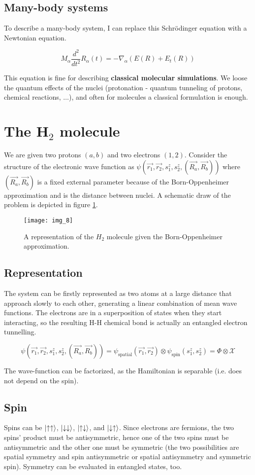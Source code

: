 	\subsection{Many-body systems}
	To describe a many-body system, I can replace this Schr\"odinger equation with a Newtonian equation.

	$$M_\alpha\frac{d^2}{dt^2}R_\alpha(t)=-\nabla_\alpha(E(R)+E_t(R))$$

	This equation is fine for describing \textbf{classical molecular simulations}.
	We loose the quantum effects of the nuclei (protonation - quantum tunneling of protons, chemical reactions, $\dots$), and often for molecules a classical formulation is enough.

\section{The H$_2$ molecule}
We are given two protons $(a,b)$ and two electrons $(1,2)$.
Consider the structure of the electronic wave function as $\psi(\vec{r_1},\vec{r_2},s_1^z,s_2^z,(\vec{R_a},\vec{R_b}))$ where $(\vec{R_a},\vec{R_b})$ is a fixed external parameter because of the Born-Oppenheimer approximation and is the distance between nuclei.
A schematic draw of the problem is depicted in figure \ref{fig:h2}.

\begin{figure}[htbp!]
	\centering
	\texttt{[image: img\_8]}
	\caption{A representation of the $H_2$ molecule given the Born-Oppenheimer approximation.}
	\label{fig:h2}
\end{figure}

	\subsection{Representation}
	The system can be firstly represented as two atoms at a large distance that approach slowly to each other, generating a linear combination of mean wave functions.
	The electrons are in a superposition of states when they start interacting, so the resulting H-H chemical bond is actually an entangled electron tunnelling.

	$$\psi(\vec{r_1},\vec{r_2},s_1^z,s_2^z,(\vec{R_a},\vec{R_b}))=\psi_{\text{spatial}}(\vec{r_1},\vec{r_2})\otimes\psi_{\text{spin}}(s_1^z,s_2^z)=\Phi\otimes\mathcal{X}$$

	The wave-function can be factorized, as the Hamiltonian is separable (i.e. does not depend on the spin).

	\subsection{Spin}
	Spins can be $\ket{\uparrow\uparrow}$, $\ket{\downarrow\downarrow}$, $\ket{\uparrow\downarrow}$, and $\ket{\downarrow\uparrow}$.
	Since electrons are fermions, the two spins' product must be antisymmetric, hence one of the two spins must be antisymmetric and the other one must be symmetric (the two possibilities are spatial symmetry and spin antisymmetric or spatial antisymmetry and symmetric spin).
	Symmetry can be evaluated in entangled states, too.

